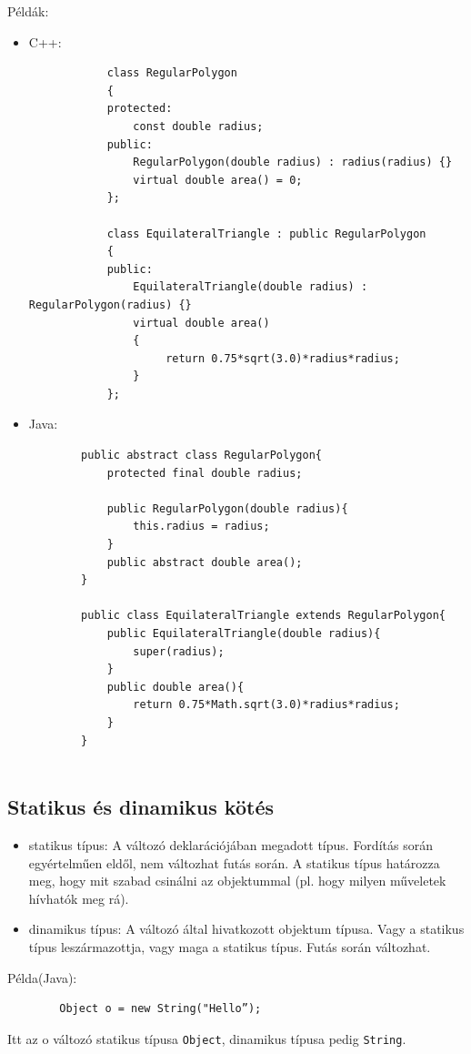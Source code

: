 \documentclass[12pt,margin=0px]{article}
\begin{document}
	\noindent Példák:
{\small
	\begin{itemize}
		\item	C++:
		\begin{verbatim}
		    class RegularPolygon
		    {
		    protected:
		        const double radius;
		    public:
		        RegularPolygon(double radius) : radius(radius) {}
		        virtual double area() = 0;
		    };
		
		    class EquilateralTriangle : public RegularPolygon
		    {
		    public:
		        EquilateralTriangle(double radius) : RegularPolygon(radius) {}
		        virtual double area()
		        {
		             return 0.75*sqrt(3.0)*radius*radius;
		        }
		    };
		\end{verbatim}
\newpage	
		\item	Java:
		\begin{verbatim}
		public abstract class RegularPolygon{
		    protected final double radius;
		
		    public RegularPolygon(double radius){
		        this.radius = radius;
		    }
		    public abstract double area();
		}
		
		public class EquilateralTriangle extends RegularPolygon{
		    public EquilateralTriangle(double radius){
		        super(radius);
		    }
		    public double area(){
	 	        return 0.75*Math.sqrt(3.0)*radius*radius;
		    }
		}
		
		\end{verbatim}
	\end{itemize}
}
	
	\subsection{Statikus és dinamikus kötés}
	
	\begin{itemize}
		\item	statikus típus: A változó deklarációjában megadott típus. Fordítás során egyértelműen eldől, nem változhat
		futás során. A statikus típus határozza meg, hogy mit szabad csinálni az objektummal (pl. hogy milyen
		műveletek hívhatók meg rá).
		
		\item	dinamikus típus: A változó által hivatkozott objektum típusa. Vagy a statikus típus leszármazottja, vagy maga
		a statikus típus. Futás során változhat.
	\end{itemize}
	
	\noindent Példa(Java):
	\begin{verbatim}
		Object o = new String("Hello”);
	\end{verbatim}
	Itt az o változó statikus típusa \texttt{Object}, dinamikus típusa pedig \texttt{String}.\\
\end{document}
